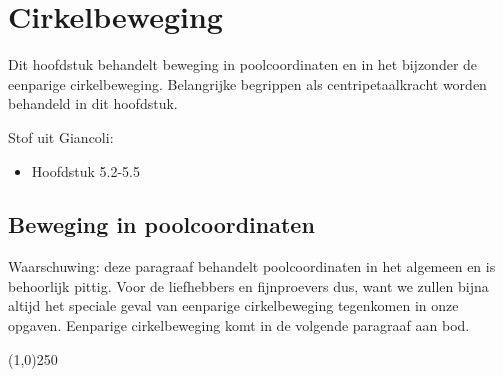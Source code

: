 \chapter{Cirkelbeweging}

Dit hoofdstuk behandelt beweging in poolcoordinaten en in het bijzonder de eenparige
cirkelbeweging. Belangrijke begrippen als centripetaalkracht worden behandeld in dit
hoofdstuk.

Stof uit Giancoli:
\begin{itemize}
\item Hoofdstuk 5.2-5.5
\end{itemize}


\section{Beweging in poolcoordinaten}

Waarschuwing: deze paragraaf behandelt poolcoordinaten in het algemeen en is behoorlijk pittig. 
Voor de liefhebbers en fijnproevers dus, want we zullen bijna altijd het speciale geval van eenparige
cirkelbeweging tegenkomen in onze opgaven. Eenparige cirkelbeweging komt in de volgende paragraaf
aan bod.

\begin{center}
\line(1,0){250}
\end{center}

